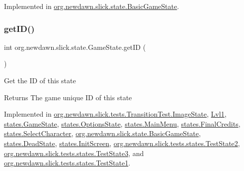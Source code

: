 Implemented in \mbox{\hyperlink{classorg_1_1newdawn_1_1slick_1_1state_1_1_basic_game_state_a911b009b86365da17fa6c1814ba2e1b4}{org.\+newdawn.\+slick.\+state.\+Basic\+Game\+State}}.

\mbox{\label{interfaceorg_1_1newdawn_1_1slick_1_1state_1_1_game_state_a54f2bc6a91feaf0614a5ef19f1d03313}} 
\subsubsection{\texorpdfstring{get\+I\+D()}{getID()}}
{\footnotesize\ttfamily int org.\+newdawn.\+slick.\+state.\+Game\+State.\+get\+ID (\begin{DoxyParamCaption}{ }\end{DoxyParamCaption})}

Get the ID of this state

\begin{DoxyReturn}{Returns}
The game unique ID of this state 
\end{DoxyReturn}


Implemented in \mbox{\hyperlink{classorg_1_1newdawn_1_1slick_1_1tests_1_1_transition_test_1_1_image_state_a1c34b3d7fa12b658f0d2b1a45cbb5c15}{org.\+newdawn.\+slick.\+tests.\+Transition\+Test.\+Image\+State}}, \mbox{\hyperlink{class_lvl1_a7753633f6de7e33f5049c3621e6cb049}{Lvl1}}, \mbox{\hyperlink{classstates_1_1_game_state_a7d95efb1651c71933e6c3228829cfb33}{states.\+Game\+State}}, \mbox{\hyperlink{classstates_1_1_options_state_a8db11ba0aff06b6e7afe929599640c73}{states.\+Options\+State}}, \mbox{\hyperlink{classstates_1_1_main_menu_adbf17a27cb74ddf0365ca09fd0758b3f}{states.\+Main\+Menu}}, \mbox{\hyperlink{classstates_1_1_final_credits_aa078f93a7bd5ae2194d959f8dded659f}{states.\+Final\+Credits}}, \mbox{\hyperlink{classstates_1_1_select_character_a06b40374019fef5b3f3f88be6a3a8686}{states.\+Select\+Character}}, \mbox{\hyperlink{classorg_1_1newdawn_1_1slick_1_1state_1_1_basic_game_state_a781ce2b3d6dd9b9853adb011f5e75cf7}{org.\+newdawn.\+slick.\+state.\+Basic\+Game\+State}}, \mbox{\hyperlink{classstates_1_1_dead_state_aed9ba185773a1be650305bd8c8d00a20}{states.\+Dead\+State}}, \mbox{\hyperlink{classstates_1_1_init_screen_a7ca8734976ee39db7bd5c72d63e7a9b9}{states.\+Init\+Screen}}, \mbox{\hyperlink{classorg_1_1newdawn_1_1slick_1_1tests_1_1states_1_1_test_state2_a953f427bf8f09b723e036ee8eb5b455c}{org.\+newdawn.\+slick.\+tests.\+states.\+Test\+State2}}, \mbox{\hyperlink{classorg_1_1newdawn_1_1slick_1_1tests_1_1states_1_1_test_state3_a0cd328d3f5ef77423e54e7e51ff87dab}{org.\+newdawn.\+slick.\+tests.\+states.\+Test\+State3}}, and \mbox{\hyperlink{classorg_1_1newdawn_1_1slick_1_1tests_1_1states_1_1_test_state1_a441e5a49fc651b943a076d76dafa360c}{org.\+newdawn.\+slick.\+tests.\+states.\+Test\+State1}}.

